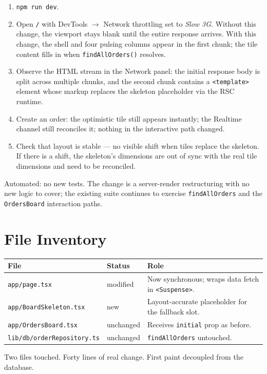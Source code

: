 \documentclass[11pt]{article}
\begin{document}
\begin{enumerate}[leftmargin=1.4em, itemsep=0.15em]
  \item \texttt{npm run dev}.
  \item Open \texttt{/} with DevTools $\to$ Network throttling set to \emph{Slow 3G}. Without this change, the viewport stays blank until the entire response arrives. With this change, the shell and four pulsing columns appear in the first chunk; the tile content fills in when \texttt{findAllOrders()} resolves.
  \item Observe the HTML stream in the Network panel: the initial response body is split across multiple chunks, and the second chunk contains a \texttt{<template>} element whose markup replaces the skeleton placeholder via the RSC runtime.
  \item Create an order: the optimistic tile still appears instantly; the Realtime channel still reconciles it; nothing in the interactive path changed.
  \item Check that layout is stable --- no visible shift when tiles replace the skeleton. If there is a shift, the skeleton's dimensions are out of sync with the real tile dimensions and need to be reconciled.
\end{enumerate}

Automated: no new tests. The change is a server-render restructuring with no new logic to cover; the existing suite continues to exercise \texttt{findAllOrders} and the \texttt{OrdersBoard} interaction paths.

\section{File Inventory}

\begin{table}[h]
  \centering
  \begin{tabular}{@{}llp{7.5cm}@{}}
    \toprule
    File & Status & Role \\
    \midrule
    \texttt{app/page.tsx} & modified & Now synchronous; wraps data fetch in \texttt{<Suspense>}. \\
    \texttt{app/BoardSkeleton.tsx} & new & Layout-accurate placeholder for the fallback slot. \\
    \texttt{app/OrdersBoard.tsx} & unchanged & Receives \texttt{initial} prop as before. \\
    \texttt{lib/db/orderRepository.ts} & unchanged & \texttt{findAllOrders} untouched. \\
    \bottomrule
  \end{tabular}
\end{table}

\noindent Two files touched. Forty lines of real change. First paint decoupled from the database.
\end{document}
